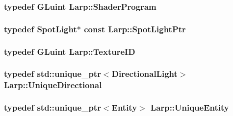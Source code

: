 \subsubsection[{\texorpdfstring{Shader\+Program}{ShaderProgram}}]{\setlength{\rightskip}{0pt plus 5cm}typedef G\+Luint {\bf Larp\+::\+Shader\+Program}}\hypertarget{namespaceLarp_a9b24f5785486fc97891b6c8148d80953}{}\label{namespaceLarp_a9b24f5785486fc97891b6c8148d80953}
\subsubsection[{\texorpdfstring{Spot\+Light\+Ptr}{SpotLightPtr}}]{\setlength{\rightskip}{0pt plus 5cm}typedef {\bf Spot\+Light}$\ast$ const {\bf Larp\+::\+Spot\+Light\+Ptr}}\hypertarget{namespaceLarp_a5366be98946441fcea9b8a155bc52d95}{}\label{namespaceLarp_a5366be98946441fcea9b8a155bc52d95}
\subsubsection[{\texorpdfstring{Texture\+ID}{TextureID}}]{\setlength{\rightskip}{0pt plus 5cm}typedef G\+Luint {\bf Larp\+::\+Texture\+ID}}\hypertarget{namespaceLarp_a74839f089efb43154cba04bae031c942}{}\label{namespaceLarp_a74839f089efb43154cba04bae031c942}
\subsubsection[{\texorpdfstring{Unique\+Directional}{UniqueDirectional}}]{\setlength{\rightskip}{0pt plus 5cm}typedef std\+::unique\+\_\+ptr$<${\bf Directional\+Light}$>$ {\bf Larp\+::\+Unique\+Directional}}\hypertarget{namespaceLarp_af87ce889468b60d51aa1479335ba19bf}{}\label{namespaceLarp_af87ce889468b60d51aa1479335ba19bf}
\subsubsection[{\texorpdfstring{Unique\+Entity}{UniqueEntity}}]{\setlength{\rightskip}{0pt plus 5cm}typedef std\+::unique\+\_\+ptr$<${\bf Entity}$>$ {\bf Larp\+::\+Unique\+Entity}}\hypertarget{namespaceLarp_ad6d203c6dc3d8ea7a5517a64e1665403}{}\label{namespaceLarp_ad6d203c6dc3d8ea7a5517a64e1665403}
